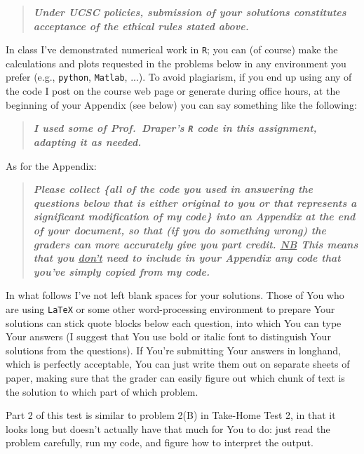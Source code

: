 \documentclass[12pt]{article}
\newcommand{\bi}[1]{\b{\i{#1}}}
\renewcommand{\b}[1]{\textbf{#1}}
\renewcommand{\i}[1]{\textit{#1}}
\renewcommand{\t}[1]{\texttt{#1}}
\renewcommand{\u}[1]{\underline{#1}}
\begin{document}
\begin{quote}

\bi{Under UCSC policies, submission of your solutions constitutes acceptance of the ethical rules stated above.}

\end{quote}

In class I've demonstrated numerical work in \texttt{R}; you can (of course) make the calculations and plots requested in the problems below in any environment you prefer (e.g., \t{python}, \texttt{Matlab}, ...). To avoid plagiarism, if you end up using any of the code I post on the course web page or generate during office hours, at the beginning of your Appendix (see below) you can say something like the following:

\begin{quote}

\bi{I used some of Prof.~Draper's \texttt{R} code in this assignment, adapting it as needed.}

\end{quote}

As for the Appendix:

\begin{quote}

\bi{Please collect \{all of the code you used in answering the questions below that is either original to you or that represents a significant modification of my code\} into an Appendix at the end of your document, so that (if you do something wrong) the graders can more accurately give you part credit. \u{NB} This means that you \u{don't} need to include in your Appendix any code that you've simply copied from my code.} 

\end{quote}

In what follows I've not left blank spaces for your solutions. Those of You who are using \texttt{LaTeX} or some other word-processing environment to prepare Your solutions can stick quote blocks below each question, into which You can type Your answers (I suggest that You use bold or italic font to distinguish Your solutions from the questions). If You're submitting Your answers in longhand, which is perfectly acceptable, You can just write them out on separate sheets of paper, making sure that the grader can easily figure out which chunk of text is the solution to which part of which problem.

Part 2 of this test is similar to problem 2(B) in Take-Home Test 2, in that it looks long but doesn't actually have that much for You to do: just read the problem carefully, run my code, and figure how to interpret the output.
\end{document}
